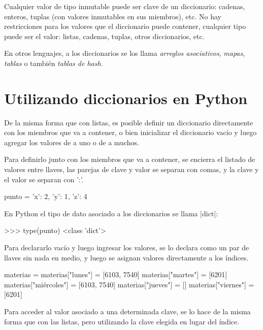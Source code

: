 Cualquier valor de tipo inmutable puede ser clave de un diccionario:
cadenas, enteros, tuplas (con valores inmutables en sus miembros), etc.  No hay
restricciones para los valores que el diccionario puede contener, cualquier
tipo puede ser el valor: listas, cadenas, tuplas, otros diccionarios,
etc.

\begin{sabias_que}
En otros lenguajes, a los diccionarios se los llama {\it arreglos asociativos},
{\it mapas}, {\it tablas} o también {\it tablas de hash}.
\end{sabias_que}

\section{Utilizando diccionarios en Python}

De la misma forma que con listas, es posible definir un diccionario
directamente con los miembros que va a contener, o bien inicializar el
diccionario vacío y luego agregar los valores de a uno o de a muchos.

Para definirlo junto con los miembros que va a contener, se encierra el
listado de valores entre llaves, las parejas de clave y valor se separan
con comas, y la clave y el valor se separan con ':'.

\begin{codigo-python-sn}
punto = {'x': 2, 'y': 1, 'z': 4}
\end{codigo-python-sn}

\begin{observacion}
En Python el tipo de dato asociado a los diccionarios se llama |dict|:

\begin{codigo-python-sn}
>>> type(punto)
<class 'dict'>
\end{codigo-python-sn}
\end{observacion}

Para declararlo vacío y luego ingresar los valores, se lo declara como un
par de llaves sin nada en medio, y luego se asignan valores directamente a
los índices.

\begin{codigo-python-sn}
materias = {}
materias["lunes"] = [6103, 7540]
materias["martes"] = [6201]
materias["miércoles"] = [6103, 7540]
materias["jueves"] = []
materias["viernes"] = [6201]
\end{codigo-python-sn}

Para acceder al valor asociado a una determinada clave, se lo hace
de la misma forma que con las listas, pero utilizando la clave
elegida en lugar del índice.

